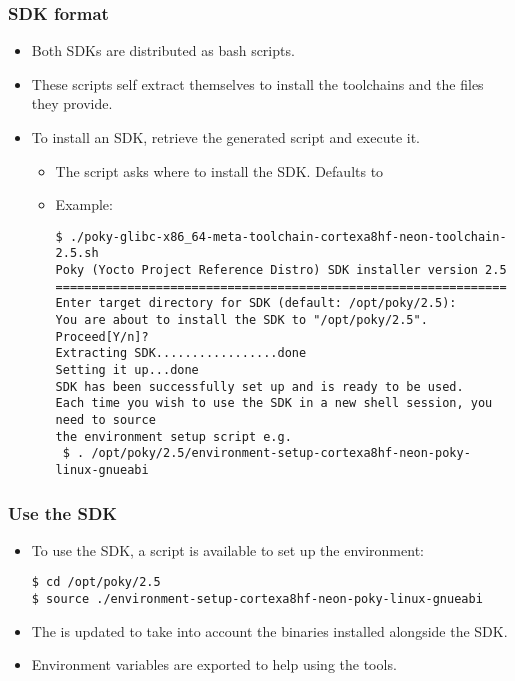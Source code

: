 \begin{frame}[fragile]
  \frametitle{SDK format}
  \begin{itemize}
    \item Both SDKs are distributed as bash scripts.
    \item These scripts self extract themselves to install the
      toolchains and the files they provide.
    \item To install an SDK, retrieve the generated script and execute
      it.
      \begin{itemize}
        \item The script asks where to install the SDK. Defaults to
        \item Example: 
        \begin{block}{}
          \begin{verbatim}
$ ./poky-glibc-x86_64-meta-toolchain-cortexa8hf-neon-toolchain-2.5.sh
Poky (Yocto Project Reference Distro) SDK installer version 2.5
===============================================================
Enter target directory for SDK (default: /opt/poky/2.5):
You are about to install the SDK to "/opt/poky/2.5". Proceed[Y/n]?
Extracting SDK.................done
Setting it up...done
SDK has been successfully set up and is ready to be used.
Each time you wish to use the SDK in a new shell session, you need to source
the environment setup script e.g.
 $ . /opt/poky/2.5/environment-setup-cortexa8hf-neon-poky-linux-gnueabi
          \end{verbatim}
        \end{block}
      \end{itemize}
  \end{itemize}
\end{frame}

\begin{frame}[fragile]
  \frametitle{Use the SDK}
  \begin{itemize}
    \item To use the SDK, a script is available to set up the
      environment:
      \begin{block}{}
        \begin{verbatim}
$ cd /opt/poky/2.5
$ source ./environment-setup-cortexa8hf-neon-poky-linux-gnueabi
        \end{verbatim}
      \end{block}
    \item The  is updated to take into account the binaries
      installed alongside the SDK.
    \item Environment variables are exported to help using the tools.
  \end{itemize}
\end{frame}


